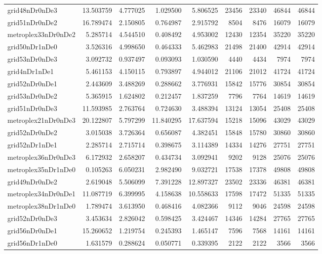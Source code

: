 \begin{longtable}{|l|r|r|r|r|r|r|r|r|}
grid48nDr0nDe3 & 13.503759 & 4.777025 & 1.029500 & 5.806525 & 23456 & 23340 & 46844 & 46844 \\
grid51nDr0nDe2 & 16.789474 & 2.150805 & 0.764987 & 2.915792 & 8504 & 8476 & 16079 & 16079 \\
metroplex33nDr0nDe2 & 5.285714 & 4.544510 & 0.408492 & 4.953002 & 12430 & 12354 & 35220 & 35220 \\
grid50nDr1nDe0 & 3.526316 & 4.998650 & 0.464333 & 5.462983 & 21498 & 21400 & 42914 & 42914 \\
grid53nDr0nDe3 & 3.092732 & 0.937497 & 0.093093 & 1.030590 & 4440 & 4434 & 7974 & 7974 \\
grid4nDr1nDe1 & 5.461153 & 4.150115 & 0.793897 & 4.944012 & 21106 & 21012 & 41724 & 41724 \\
grid52nDr0nDe1 & 2.443609 & 3.488269 & 0.288662 & 3.776931 & 15842 & 15776 & 30854 & 30854 \\
grid53nDr0nDe2 & 5.365915 & 1.624802 & 0.212457 & 1.837259 & 7796 & 7764 & 14619 & 14619 \\
grid51nDr0nDe3 & 11.593985 & 2.763764 & 0.724630 & 3.488394 & 13124 & 13054 & 25408 & 25408 \\
metroplex21nDr0nDe3 & 20.122807 & 5.797299 & 11.840295 & 17.637594 & 15218 & 15096 & 43029 & 43029 \\
grid52nDr0nDe2 & 3.015038 & 3.726364 & 0.656087 & 4.382451 & 15848 & 15780 & 30860 & 30860 \\
grid52nDr1nDe1 & 2.285714 & 2.715714 & 0.398675 & 3.114389 & 14334 & 14276 & 27751 & 27751 \\
metroplex36nDr0nDe3 & 6.172932 & 2.658207 & 0.434734 & 3.092941 & 9202 & 9128 & 25076 & 25076 \\
metroplex35nDr1nDe0 & 0.105263 & 6.050231 & 2.982490 & 9.032721 & 17538 & 17378 & 49808 & 49808 \\
grid49nDr0nDe2 & 2.619048 & 5.506099 & 7.391228 & 12.897327 & 23502 & 23336 & 46381 & 46381 \\
metroplex34nDr0nDe1 & 11.087719 & 6.399995 & 4.158638 & 10.558633 & 17598 & 17472 & 51335 & 51335 \\
metroplex38nDr1nDe0 & 1.789474 & 3.613950 & 0.468416 & 4.082366 & 9112 & 9046 & 24598 & 24598 \\
grid52nDr0nDe3 & 3.453634 & 2.826042 & 0.598425 & 3.424467 & 14346 & 14284 & 27765 & 27765 \\
grid56nDr0nDe1 & 15.260652 & 1.219754 & 0.245393 & 1.465147 & 7596 & 7568 & 14161 & 14161 \\
grid56nDr1nDe0 & 1.631579 & 0.288624 & 0.050771 & 0.339395 & 2122 & 2122 & 3566 & 3566 \\

\end{longtable}
